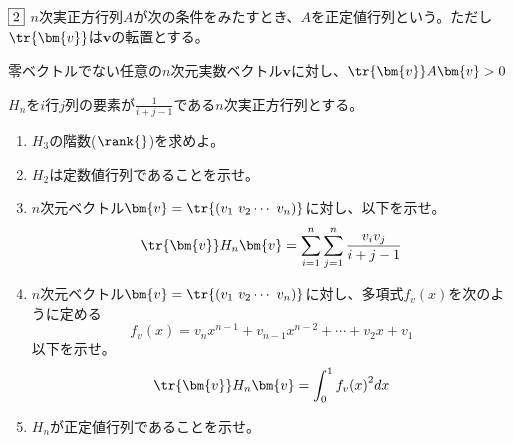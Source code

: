 \begin{tcolorbox} %
	$\fbox{2}$ $n$次実正方行列$A$が次の条件をみたすとき、$A$を正定値行列という。ただし$\tr{\bm{v}}$は$\bm{v}$の転置とする。
\begin{tcolorbox}
	零ベクトルでない任意の$n$次元実数ベクトル$\bm{v}$に対し、$\tr{\bm{v}} A\bm{v}> 0$
\end{tcolorbox}
	$H_n$を$i$行$j$列の要素が$\frac{1}{i+ j- 1}$である$n$次実正方行列とする。
\begin{enumerate}
	\item $H_3$の階数($\rank{}$)を求めよ。
	\item $H_2$は定数値行列であることを示せ。
	\item $n$次元ベクトル$\bm{v}= \tr{(v_1\ v_2\cdots\ v_n)}$に対し、以下を示せ。
\begin{equation*}
	\tr{\bm{v}} H_n\bm{v}= \sum_{i= 1}^n\sum_{j= 1}^n \frac{v_i v_j}{i+ j-1}
\end{equation*}
	\item $n$次元ベクトル$\bm{v}= \tr{(v_1\ v_2\cdots\ v_n)}$に対し、多項式$f_v(x)$を次のように定める
\begin{equation*}
	f_v(x)= v_n x^{n-1}+ v_{n- 1} x^{n- 2}+ \cdots+ v_2 x+ v_1
\end{equation*}
	以下を示せ。
\begin{equation*}
	\tr{\bm{v}} H_n\bm{v}= \int_0^1 {f_v(x)}^2 dx
\end{equation*}
	\item $H_n$が正定値行列であることを示せ。
\end{enumerate}
\end{tcolorbox}

